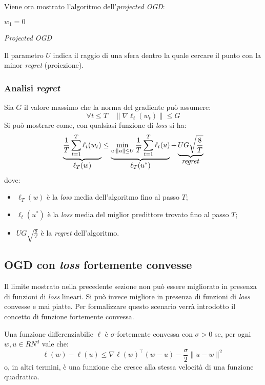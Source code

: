 Viene ora mostrato l'algoritmo dell'\textit{projected OGD}:

\begin{algorithm}[H]
    \DontPrintSemicolon
    \;
    $w_1 = 0\qquad$ \hspace{9.6em}\;
    \caption{\textit{Projected OGD}}
\end{algorithm}
Il parametro $U$ indica il raggio di una sfera dentro la quale cercare il
punto con la minor \textit{regret} (proiezione).

\subsubsection{Analisi \textit{regret}}
Sia $G$ il valore massimo che la norma del gradiente può assumere:
$$ \forall t\leq T \quad \| \nabla\ell_t(w_t)\|\leq G  $$
Si può mostrare come, con qualsiasi funzione di \textit{loss} si ha:
$$
\underbrace{\frac{1}{T}\sum_{t=1}^{T}\ell_t(w_t)}_{\displaystyle\ell_T(w)}\leq
\underbrace{\min_{u:\|u\|\leq U} \frac{1}{T}\sum_{t=1}^T \ell_t(u)}_
    {\displaystyle\ell_T(u^*)}
+\underbrace{UG\sqrt{\frac{8}{T}}}_{\displaystyle\text{\textit{regret}}}
$$
dove:
\begin{itemize}
    \item $\ell_T(w)$ è la \textit{loss} media dell'algoritmo fino al passo $T$;
    \item $\ell_t(u^*)$ è la \textit{loss} media del miglior predittore trovato
        fino al passo $T$;
    \item $UG\sqrt{\frac{8}{T}}$ è la \textit{regret} dell'algoritmo.
\end{itemize}

\subsection{OGD con \textit{loss} fortemente convesse}
Il limite mostrato nella precedente sezione non può essere migliorato in presenza
di funzioni di \textit{loss} lineari. Si può invece migliore in presenza di
funzioni di \textit{loss} convesse e mai piatte. Per formalizzare questo scenario
verrà introdotto il concetto di funzione fortemente convessa.

Una funzione differenziabilie $\ell$ è $\sigma$-fortemente convessa con $\sigma>0$
se, per ogni $w,u \in RN^d$ vale che:
$$ \ell(w) - \ell(u) \leq \nabla\ell(w)^\top (w-u)-\frac{\sigma}{2}\|u-w\|^2 $$
o, in altri termini, è una funzione che cresce alla stessa velocità di una funzione
quadratica.

